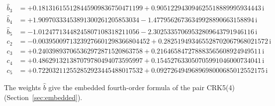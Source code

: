 {\begin{align*}
\hat b_{3} &= +0.181316155128445909836750471199 + 0.905122943094625518889995934443\,\mathrm{i}\\
\hat b_{4} &= +1.90970333453891300261205853034 - 1.47795626736349928890663158894\,\mathrm{i}\\
\hat b_{5} &= -1.01247713448245807108318211056 - 2.30253357069532809643791946116\,\mathrm{i}\\[1mm]
c_{2} &= -0.00395009713239276601298366804452 + 0.282519493465528702067968021572\,\mathrm{i}\\
c_{3} &= +0.240398937065362972871520863758 + 0.216465847278883565608924949511\,\mathrm{i}\\
c_{4} &= +0.486291321387079780494073595997 + 0.154527633050705991046000734041\,\mathrm{i}\\
c_{5} &= +0.722032112552852923445488017532 + 0.0927264949689698000685012552175\,\mathrm{i}
\end{align*}
}

The weights $\hat b$ give the embedded fourth-order formula of the pair CRK5(4) (Section~\ref{sec:embedded}).
